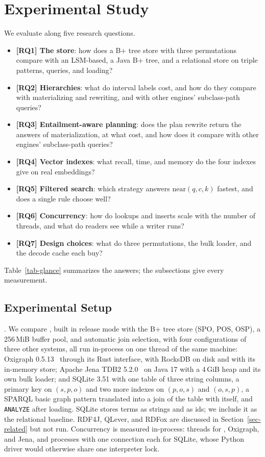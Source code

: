\section{Experimental Study}
\label{sec-exp}

We evaluate \sys along five research questions.
\begin{itemize}
\item \textbf{[RQ1] The store}: how does a B+ tree store with three
  permutations compare with an LSM-based, a Java B+ tree, and a relational
  store on triple patterns, queries, and loading?
\item \textbf{[RQ2] Hierarchies}: what do interval labels cost, and how do they
  compare with materializing and rewriting, and with other engines'
  subclass-path queries?
\item \textbf{[RQ3] Entailment-aware planning}: does the plan rewrite return
  the answers of materialization, at what cost, and how does it compare with
  other engines' subclass-path queries?
\item \textbf{[RQ4] Vector indexes}: what recall, time, and memory do the
  four indexes give on real embeddings?
\item \textbf{[RQ5] Filtered search}: which strategy answers
  $\mathrm{near}(q,c,k)$ fastest, and does a single rule choose well?
\item \textbf{[RQ6] Concurrency}: how do lookups and inserts scale with the
  number of threads, and what do readers see while a writer runs?
\item \textbf{[RQ7] Design choices}: what do three permutations, the bulk
  loader, and the decode cache each buy?
\end{itemize}

Table~\ref{tab-glance} summarizes the answers; the subsections give every
measurement.



\subsection{Experimental Setup}

.
We compare \sys, built in release mode with the B+ tree store (SPO, POS, OSP),
a 256\,MiB buffer pool, and automatic join selection, with four configurations
of three other systems, all run in-process on one thread of the same
machine: Oxigraph 0.5.13~\cite{oxigraph} through its Rust interface, with
RocksDB on disk and with its in-memory store; Apache Jena TDB2
5.2.0~\cite{jenatdb} on Java 17 with a 4\,GiB heap and its own bulk loader;
and SQLite 3.51 with one table of three string columns, a primary key on
$(s,p,o)$ and two more indexes on $(p,o,s)$ and $(o,s,p)$, a SPARQL basic
graph pattern translated into a join of the table with itself, and
\texttt{ANALYZE} after loading.
SQLite stores terms as strings and \sys as ids; we include it as the
relational baseline.
RDF4J, QLever, and RDFox are discussed in Section~\ref{sec-related} but not run.
Concurrency is measured in-process: threads for \sys, Oxigraph, and Jena, and
processes with one connection each for SQLite, whose Python driver would
otherwise share one interpreter lock.

